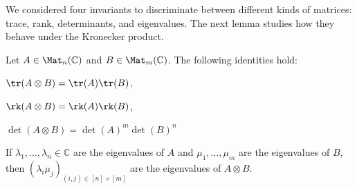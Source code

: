 \documentclass[a4paper,oneside, 12pt]{amsart}
\begin{document}
We considered four invariants to discriminate between different kinds of matrices: trace, rank, determinants, and eigenvalues.
The next lemma studies how they  behave under the Kronecker product.

\begin{lemma}\label{lem:rank-trace-det-ev-Kronecker}
  Let \(A \in \Mat_{n}( \mathbb{C})\) and \(B \in \Mat_{m} ( \mathbb{C})\).
  The following identities hold:
  \begin{thmlist}
    \item \(\tr(A\otimes B) = \tr(A)\tr(B)\),
    \item \(\rk(A\otimes B) = \rk(A) \rk(B)\),
    \item \(\det(A\otimes B)= \det(A)^{m}\det(B)^{n}\)
    \item If \(\lambda_{1}, \dots , \lambda_{n} \in \mathbb{C}\) are the eigenvalues of \(A\) and \(\mu_{1}, \dots , \mu_{m}\) are the eigenvalues of \(B\), then \((\lambda_{i}\mu_{j})_{(i,j)\in [n]\times[m]}\) are the eigenvalues of \(A\otimes B\).
  \end{thmlist}
\end{lemma}
\end{document}
